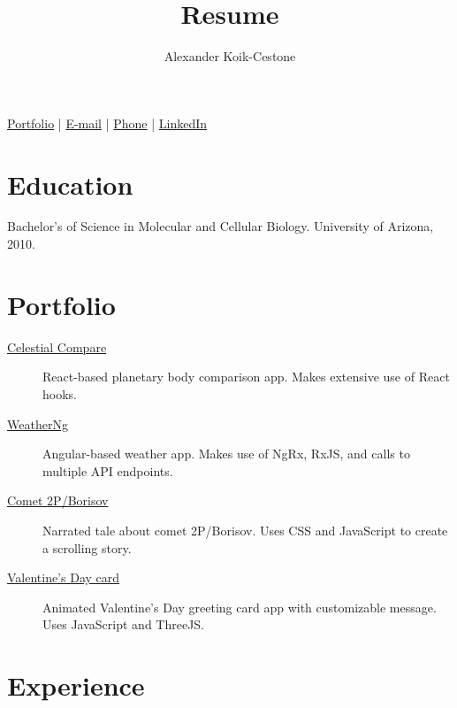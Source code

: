 \documentclass{article}
\author{Alexander Koik-Cestone}
\title{Resume}
\begin{document}
\maketitle
\begin{center}
\href{https://sirkoik.github.io#portfolio}{Portfolio} |
\href{mailto:akoikcestone@gmail.com}{E-mail} |
\href{tel:614-674-0668}{Phone} |
\href{https://www.linkedin.com/in/alexander-koik-cestone-89304556/}{LinkedIn}
\end{center}

\section{Education}
Bachelor's of Science in Molecular and Cellular Biology. University of Arizona, 2010.

\section{Portfolio}

\begin{description}
  \item[\href{https://sirkoik.github.io/Celestial-Compare}{Celestial Compare}] React-based planetary body comparison app. Makes extensive use of React hooks.
  \item[\href{https://sirkoik.github.io/WeatherNg}{WeatherNg}] Angular-based weather app. Makes use of NgRx, RxJS, and calls to multiple API endpoints. 
  \item[\href{https://sirkoik.github.io/BorisovXmas}{Comet 2P/Borisov}] Narrated tale about comet 2P/Borisov. Uses CSS and JavaScript to create a scrolling story. 
  \item[\href{https://sirkoik.github.io/February}{Valentine's Day card}] Animated Valentine's Day greeting card app with customizable message. Uses JavaScript and ThreeJS.
\end{description}

\section{Experience}
\end{document}
